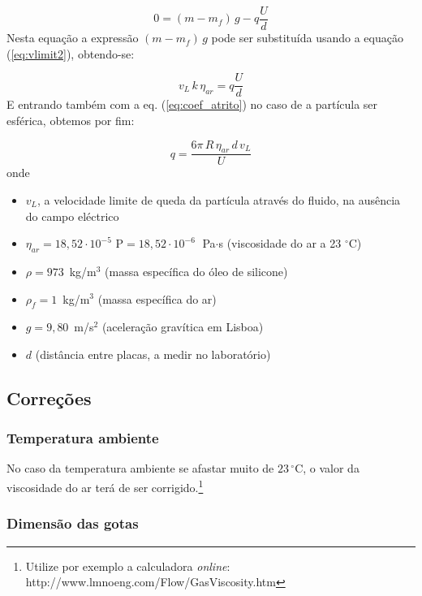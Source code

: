 \documentclass[a4paper,twoside,11pt]{report}      %
\begin{document}
\begin{equation}
	\label{eq:equil}
	0 = (m - m_f)\,g  - q \frac{U}{d} 
\end{equation}
Nesta equação a expressão $(m - m_f)\,g$ pode ser substituída usando a equação (\ref{eq:vlimit2}), obtendo-se:

\begin{equation*}
	v_L\, k\, \eta_{ar} = q \frac{U}{d}
\end{equation*}
E entrando também com a eq. (\ref{eq:coef_atrito}) no caso de a partícula ser esférica, obtemos por fim:

\begin{equation}
	\label{eq:carga}
	q = \frac{6 \pi \, R \, \eta_{ar} \, d\, v_L}{U}  
\end{equation}
onde

\begin{itemize}
\item $v_L$, a velocidade limite de queda da partícula através do fluido, na ausência do campo eléctrico
\item $\eta_{ar} = 18,52 \cdot 10^{-5}$ P$ =  18,52 \cdot 10^{-6} \;$ Pa$\cdot$s (viscosidade do ar a 23 $^{\circ}$C)
\item $\rho = 973 \,$ kg/m$^{3}$ (massa específica do óleo de silicone)
\item $\rho_f = 1 \,$ kg/m$^{3}$ (massa específica do ar)
\item $g=9,80\,$ m/s$^{2}$ (aceleração gravítica em Lisboa)
\item $d$ (distância entre placas, a medir no laboratório)
\end{itemize}

\subsection{\sf Correções}
\subsubsection{\sf Temperatura ambiente}

No caso da temperatura ambiente se afastar muito de $23\,^{\circ}\mathrm{C}$, o valor  da viscosidade do ar terá de ser corrigido.\footnote{Utilize por exemplo a calculadora \emph{online}: http://www.lmnoeng.com/Flow/GasViscosity.htm}

\subsubsection{\sf Dimensão das gotas}
\end{document}
